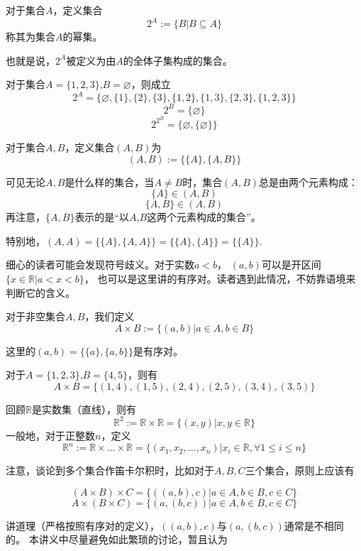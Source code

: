 \begin{definition}[幂集]
对于集合$A$，定义集合
$$2^A:=\{B|B\subseteq A\}$$
称其为集合$A$的幂集。
\end{definition}
也就是说，$2^A$被定义为由$A$的全体子集构成的集合。

\begin{example}对于集合$A=\{1,2,3\}$,$B=\varnothing$，则成立
$$2^A=\{\varnothing,\{1\},\{2\},\{3\},
\{1,2\},\{1,3\},\{2,3\},\{1,2,3\}\}$$
$$2^B=\{\varnothing\}$$
$$2^{2^B}=\{\varnothing,\{\varnothing\}\}$$
\end{example}

\begin{definition}[有序对]
对于集合$A,B$，定义集合$(A,B)$为
$$(A,B):=\{\{A\},\{A,B\}\}$$
\end{definition}
可见无论$A,B$是什么样的集合，当$A\neq B$时，集合$(A,B)$总是由两个元素构成：
$$\{A\}\in(A,B)$$
$$\{A,B\}\in(A,B)$$
再注意，$\{A,B\}$表示的是“以$A$,$B$这两个元素构成的集合”。

特别地，$(A,A)=\{\{A\},\{A,A\}\}=\{\{A\},\{A\}\}=\{\{A\}\}$.

细心的读者可能会发现符号歧义。对于实数$a<b$，
$(a,b)$可以是开区间$\{x\in\mathbb{R}|a<x<b\}$，
也可以是这里讲的有序对。读者遇到此情况，不妨靠语境来判断它的含义。


\begin{definition}[笛卡尔积]
对于非空集合$A,B$，我们定义
$$A\times B:=\{(a,b)|a\in A, b\in B\}$$
\end{definition}
这里的$(a,b)=\{\{a\},\{a,b\}\}$是有序对。

\begin{example}对于$A=\{1,2,3\}$,$B=\{4,5\}$，则有
$$A\times B=\{(1,4),(1,5),(2,4),(2,5),(3,4),(3,5)\}$$
\end{example}

\begin{example}[$n$维空间]
回顾$\mathbb{R}$是实数集（直线），则有
$$\mathbb{R}^2:=\mathbb{R}\times\mathbb{R}
=\{(x,y)|x,y\in\mathbb{R}\}$$
一般地，对于正整数$n$，定义
$$\mathbb{R}^n:=\mathbb{R}\times...\times\mathbb{R}
=\{(x_1,x_2,...,x_n)|x_i\in\mathbb{R},\forall 1\leq i\leq n\}$$
\end{example}
注意，谈论到多个集合作笛卡尔积时，比如对于$A,B,C$三个集合，原则上应该有

$$(A\times B)\times C=\{((a,b),c)|a\in A,b\in B, c\in C\}$$
$$A\times (B\times C)=\{(a,(b,c))|a\in A,b\in B, c\in C\}$$

讲道理（严格按照有序对的定义），$((a,b),c)$与$(a,(b,c))$通常是不相同的。
本讲义中尽量避免如此繁琐的讨论，暂且认为

